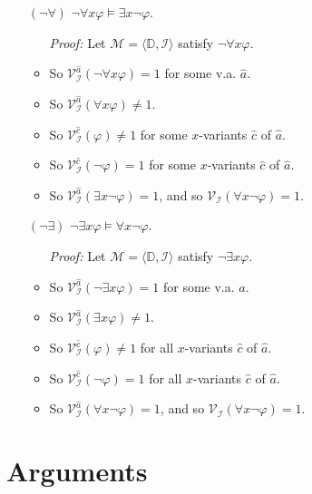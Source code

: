 \documentclass[a4paper, 11pt]{article} %
\newcommand{\tuple}[1]{\langle#1\rangle} %
\newcommand{\I}{\mathcal{I}}
\newcommand{\M}{\mathcal{M}}
\newcommand{\D}{\mathbb{D}}
\newcommand{\VV}[2]{\mathcal{V}_{#1}^{#2}} %
\begin{document}
\begin{enumerate}
  \item[$({\neg}{\forall})$] $\neg\forall x \varphi \vDash \exists x\neg \varphi$.
    \begin{itemize}
      \item[\it Proof:] Let $\M=\tuple{\D,\I}$ satisfy $\neg\forall x \varphi$.
      \item So $\VV{\I}{\hat{a}}(\neg\forall x \varphi)=1$ for some v.a. $\hat{a}$.
      \item So $\VV{\I}{\hat{a}}(\forall x \varphi)\neq 1$.
      \item So $\VV{\I}{\hat{c}}(\varphi)\neq 1$ for some $x$-variants $\hat{c}$ of $\hat{a}$.
      \item So $\VV{\I}{\hat{c}}(\neg\varphi)=1$ for some $x$-variants $\hat{c}$ of $\hat{a}$.
      \item So $\VV{\I}{\hat{a}}(\exists x\neg\varphi)=1$, and so $\VV{\I}{}(\forall x\neg\varphi)=1$.
    \end{itemize}
  \item[$({\neg}{\exists})$] $\neg\exists x \varphi \vDash \forall x\neg \varphi$.
    \begin{itemize}
      \item[\it Proof:] Let $\M=\tuple{\D,\I}$ satisfy $\neg\exists x \varphi$.
      \item So $\VV{\I}{\hat{a}}(\neg\exists x \varphi)=1$ for some v.a. $\hat{a}$.
      \item So $\VV{\I}{\hat{a}}(\exists x \varphi)\neq 1$.
      \item So $\VV{\I}{\hat{c}}(\varphi)\neq 1$ for all $x$-variants $\hat{c}$ of $\hat{a}$.
      \item So $\VV{\I}{\hat{c}}(\neg\varphi)=1$ for all $x$-variants $\hat{c}$ of $\hat{a}$.
      \item So $\VV{\I}{\hat{a}}(\forall x\neg\varphi)=1$, and so $\VV{\I}{}(\forall x\neg\varphi)=1$.
    \end{itemize}
\end{enumerate}





\section*{Arguments}
\end{document}
